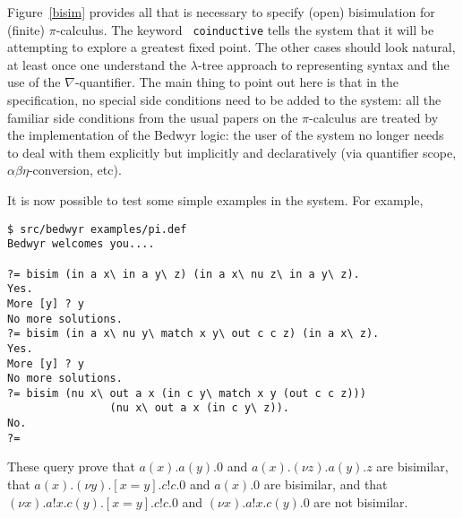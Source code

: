 \documentclass{article}
\begin{document}
Figure~\ref{bisim} provides all that is necessary to specify (open)
bisimulation for (finite) $\pi$-calculus.  The keyword {\tt
coinductive} tells the system that it will be attempting to explore a
greatest fixed point.  The other cases should look natural, at least
once one understand the $\lambda$-tree approach to representing syntax
and the use of the $\nabla$-quantifier.  The main thing to point out
here is that in the specification, no special side conditions need to
be added to the system: all the familiar side conditions from the
usual papers on the $\pi$-calculus are treated by the implementation
of the Bedwyr logic: the user of the system no longer needs to deal
with them explicitly but implicitly and declaratively (via quantifier
scope, $\alpha\beta\eta$-conversion, etc).

It is now possible to test some simple examples in the system.  For
example,
\begin{verbatim}
$ src/bedwyr examples/pi.def
Bedwyr welcomes you....

?= bisim (in a x\ in a y\ z) (in a x\ nu z\ in a y\ z).
Yes.
More [y] ? y
No more solutions.
?= bisim (in a x\ nu y\ match x y\ out c c z) (in a x\ z).
Yes.
More [y] ? y
No more solutions.
?= bisim (nu x\ out a x (in c y\ match x y (out c c z)))
                (nu x\ out a x (in c y\ z)).
No.
?= 
\end{verbatim}
These query prove that 
$a(x).a(y).0$ and $a(x).(\nu z).a(y).z$ are bisimilar, 
that
$a(x).(\nu y).[x=y].c!c.0$ and $a(x).0$ are bisimilar, and that 
$(\nu x).a!x.c(y).[x=y].c!c.0$ and 
$(\nu x).a!x.c(y).0$ are not bisimilar.

%

\end{document}
